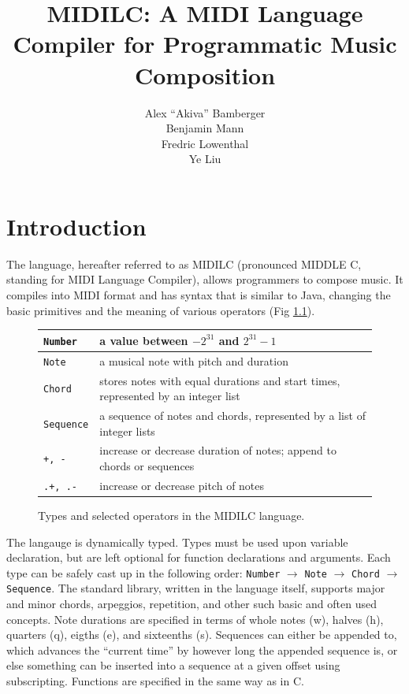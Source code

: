\documentclass[12pt,A4]{book}
\title{MIDILC:  A MIDI Language Compiler for Programmatic Music Composition}
\author{Alex ``Akiva'' Bamberger \\ Benjamin Mann \\ Fredric Lowenthal \\ Ye Liu}
\date{}
\begin{document}
\maketitle
\newpage
\tableofcontents
\newpage
\chapter{Introduction}
The language, hereafter referred to as MIDILC (pronounced MIDDLE C, standing for MIDI
Language Compiler), allows programmers to compose music. It compiles into MIDI format and
has syntax that is similar to Java, changing the basic primitives and the meaning of various
operators (Fig \ref{fig:types_in_midilc}).
\begin{figure}
\center
\begin{tabular}{|p{}|p{}|}
\hline
\verb|Number| & a value between $-2^{31}$ and $2^{31}-1$\\ \hline
\verb|Note| & a musical note with pitch and duration \\ \hline
\verb|Chord| & stores notes with equal durations and start times, represented by an integer list \\ \hline
\verb|Sequence| & a sequence of notes and chords, represented by a list of integer lists \\ \hline
\verb|+, -| & increase or decrease duration of notes; append to chords or sequences \\ \hline
\verb|.+, .-| & increase or decrease pitch of notes \\ \hline
\end{tabular}
\caption{Types and selected operators in the MIDILC language. }
\label{fig:types_in_midilc}
\end{figure}

The langauge is dynamically typed. Types must be used upon variable declaration, but are left optional for function declarations and arguments. Each type can be safely cast up in the following order: \verb|Number| $\rightarrow$ \verb|Note| $\rightarrow$ \verb|Chord| $\rightarrow$ \verb|Sequence|. The standard library, written in the language itself, supports major and minor chords, arpeggios, repetition, and other such basic and often used concepts. Note durations are specified in terms of whole notes (w), halves (h), quarters (q), eigths (e), and sixteenths (s). Sequences can either be appended to, which advances the ``current time'' by however long the appended sequence is, or else something can be inserted into a sequence at a given offset using subscripting. Functions are specified in the same way as in C.
\end{document}

